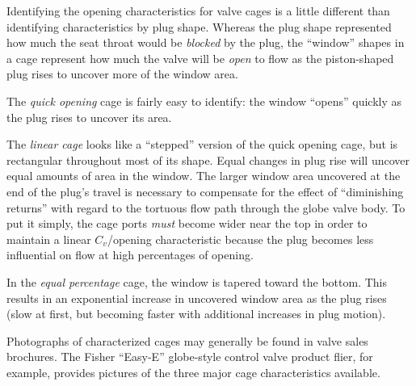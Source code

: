 





Identifying the opening characteristics for valve cages is a little different than identifying characteristics by plug shape.  Whereas the plug shape represented how much the seat throat would be {\it blocked} by the plug, the ``window'' shapes in a cage represent how much the valve will be {\it open} to flow as the piston-shaped plug rises to uncover more of the window area.

\vskip 10pt

The {\it quick opening} cage is fairly easy to identify: the window ``opens'' quickly as the plug rises to uncover its area.

\vskip 10pt

The {\it linear cage} looks like a ``stepped'' version of the quick opening cage, but is rectangular throughout most of its shape.  Equal changes in plug rise will uncover equal amounts of area in the window.  The larger window area uncovered at the end of the plug's travel is necessary to compensate for the effect of ``diminishing returns'' with regard to the tortuous flow path through the globe valve body.  To put it simply, the cage ports {\it must} become wider near the top in order to maintain a linear $C_v$/opening characteristic because the plug becomes less influential on flow at high percentages of opening.

\vskip 10pt

In the {\it equal percentage} cage, the window is tapered toward the bottom.  This results in an exponential increase in uncovered window area as the plug rises (slow at first, but becoming faster with additional increases in plug motion).

\vskip 10pt

Photographs of characterized cages may generally be found in valve sales brochures.  The Fisher ``Easy-E'' globe-style control valve product flier, for example, provides pictures of the three major cage characteristics available.




